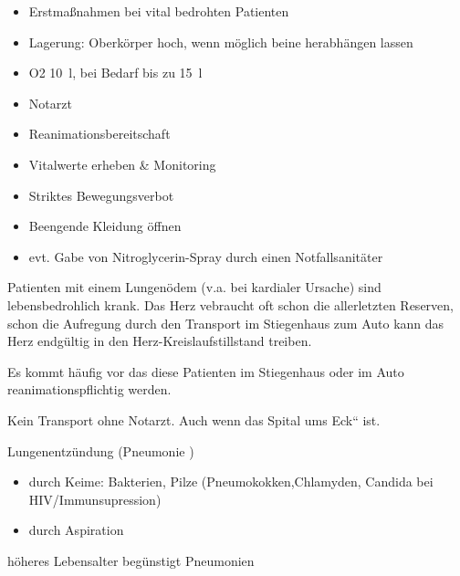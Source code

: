 \documentclass{article}
\begin{document}
\begin{itemize}
\item Erstma{\ss}nahmen bei vital bedrohten Patienten

\end{itemize}
\begin{itemize}
\item Lagerung: Oberk\"orper hoch, wenn m\"oglich beine herabh\"angen
lassen

\item O2 10~l, bei Bedarf bis zu 15~l

\item Notarzt

\item Reanimationsbereitschaft

\end{itemize}
\begin{itemize}
\item Vitalwerte erheben \& Monitoring

\item Striktes Bewegungsverbot

\item Beengende Kleidung \"offnen

\item evt. Gabe von Nitroglycerin-Spray durch einen Notfallsanit\"ater

\end{itemize}
Patienten mit einem Lungen\"odem (v.a. bei kardialer Ursache) sind
lebensbedrohlich krank. Das Herz vebraucht oft schon die allerletzten
Reserven, schon die Aufregung durch den Transport im Stiegenhaus zum
Auto kann das Herz endg\"ultig in den Herz-Kreislaufstillstand treiben.


Es kommt h\"aufig vor das diese Patienten im Stiegenhaus oder im Auto
reanimationspflichtig werden. 

Kein Transport ohne Notarzt. Auch wenn das Spital
{\quotedblbase}um{\textquotesingle}s Eck{\textquotedblleft} ist.

Lungenentz\"undung (Pneumonie )

\begin{itemize}
\item durch Keime: Bakterien, Pilze (Pneumokokken,Chlamyden, Candida bei
 HIV/Immunsupression)

\item durch Aspiration

\end{itemize}
h\"oheres Lebensalter beg\"unstigt  Pneumonien
\end{document}
